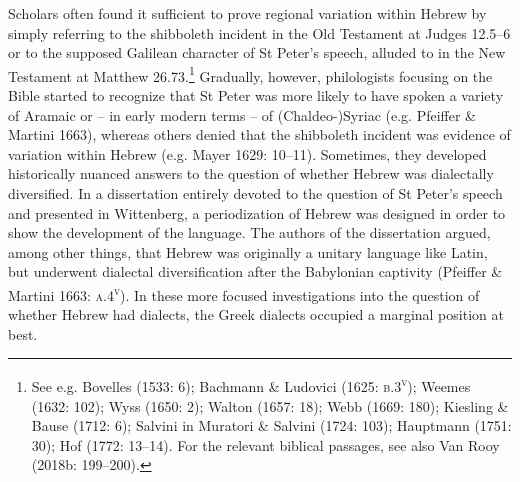 \begin{styleStandard}
Scholars often found it sufficient to prove regional variation within Hebrew by simply referring to the shibboleth incident in the Old Testament at Judges 12.5–6 or to the supposed Galilean character of St Peter’s speech, alluded to in the New Testament at Matthew 26.73.\footnote{ See e.g. Bovelles (1533: 6); Bachmann \& Ludovici (1625: \textsc{b.3}\textsc{\textsuperscript{v}}); Weemes (1632: 102); Wyss (1650: 2); Walton (1657: 18); Webb (1669: 180); Kiesling \& Bause (1712: 6); Salvini in Muratori \& Salvini (1724: 103); Hauptmann (1751: 30); Hof (1772: 13–14). For the relevant biblical passages, see also Van Rooy (2018b: 199–200).} Gradually, however, philologists focusing on the Bible started to recognize that St Peter was more likely to have spoken a variety of Aramaic or – in early modern terms – of (Chaldeo-)Syriac (e.g. Pfeiffer \& Martini 1663), whereas others denied that the shibboleth incident was evidence of variation within Hebrew (e.g. Mayer 1629: 10–11). Sometimes, they developed historically nuanced answers to the question of whether Hebrew was dialectally diversified. In a dissertation entirely devoted to the question of St Peter’s speech and presented in Wittenberg, a periodization of Hebrew was designed in order to show the development of the language. The authors of the dissertation argued, among other things, that Hebrew was originally a unitary language like Latin, but underwent dialectal diversification after the Babylonian captivity (Pfeiffer \& Martini 1663: \textsc{a.4}\textsc{\textsuperscript{v}}). In these more focused investigations into the question of whether Hebrew had dialects, the Greek dialects occupied a marginal position at best.
\end{styleStandard}

